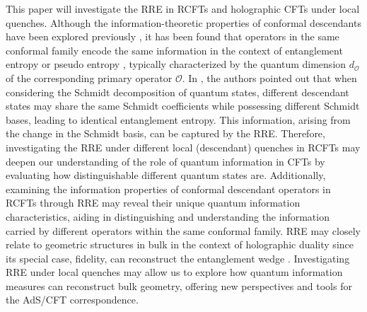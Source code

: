 \documentclass[12pt]{article}
\def \mo{\mathcal{O}}
\begin{document}
{This paper will investigate the RRE in RCFTs and holographic CFTs under local quenches.  Although the information-theoretic properties of conformal descendants have been explored previously \cite{Palmai:2014jqa, Caputa:2015tua, Taddia:2016dbm, Brehm:2020zri, Chen:2015usa, He:2023eap}, it has been found that operators in the same conformal family encode the same information in the context of entanglement entropy \cite{Caputa:2015tua, Chen:2015usa} or pseudo entropy \cite{Guo:2022sfl, He:2023eap}, typically characterized by the quantum dimension $d_{\mo}$ of the corresponding primary operator $\mo$.}{ In \cite{Caputa:2015tua}, the authors pointed out that when considering the Schmidt decomposition 
of quantum states, different descendant states may share the same Schmidt coefficients 
while possessing different Schmidt bases, leading to identical entanglement entropy. This information, arising from the change in the Schmidt basis, can be captured by the RRE. 
} Therefore, investigating the RRE under different local (descendant) quenches in RCFTs may deepen our understanding of the role of quantum information in CFTs by evaluating how distinguishable different quantum states are. Additionally, examining the information properties of conformal descendant operators in RCFTs through RRE may reveal their unique quantum information characteristics, aiding in distinguishing and understanding the information carried by different operators within the same conformal family. RRE may closely relate to geometric structures in bulk in the context of holographic duality since its special case, fidelity, can reconstruct the entanglement wedge \cite{Suzuki:2019xdq}. Investigating RRE under local quenches may allow us to explore how quantum information measures can reconstruct bulk geometry, offering new perspectives and tools for the AdS/CFT correspondence.
\end{document}
